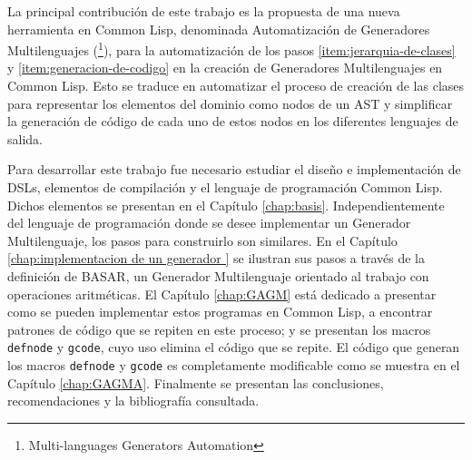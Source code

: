 \begin{introduction}
  La principal contribución de este trabajo es la propuesta de una nueva herramienta en Common Lisp, denominada Automatización de Generadores Multilenguajes (\gagm\footnote{Multi-languages Generators Automation}), para la automatización de los pasos \ref{item:jerarquia-de-clases} y \ref{item:generacion-de-codigo} en la creación de Generadores Multilenguajes en Common Lisp. Esto se traduce en automatizar el proceso de creación de las clases para representar los elementos del dominio como nodos de un AST y simplificar la generación de código de cada uno de estos nodos en los diferentes lenguajes de salida.

Para desarrollar este trabajo fue necesario estudiar el diseño e implementación de DSLs, elementos de compilación y el lenguaje de programación Common Lisp. Dichos elementos se presentan en el Capítulo \ref{chap:basis}. Independientemente del lenguaje de programación donde se desee implementar un Generador Multilenguaje, los pasos para construirlo son similares. En el Capítulo \ref{chap:implementacion de un generador } se ilustran sus pasos a través de la definición de BASAR, un Generador Multilenguaje orientado al trabajo con operaciones aritméticas. El Capítulo \ref{chap:GAGM} está dedicado a presentar como se pueden implementar estos programas en Common Lisp, a encontrar patrones de código que se repiten en este proceso; y se presentan los macros \texttt{defnode} y \texttt{gcode}, cuyo uso elimina el código que se repite. El código que generan los macros \texttt{defnode} y \texttt{gcode} es completamente modificable como se muestra en el Capítulo \ref{chap:GAGMA}. Finalmente se presentan las conclusiones, recomendaciones y la bibliografía consultada.


\end{introduction}
